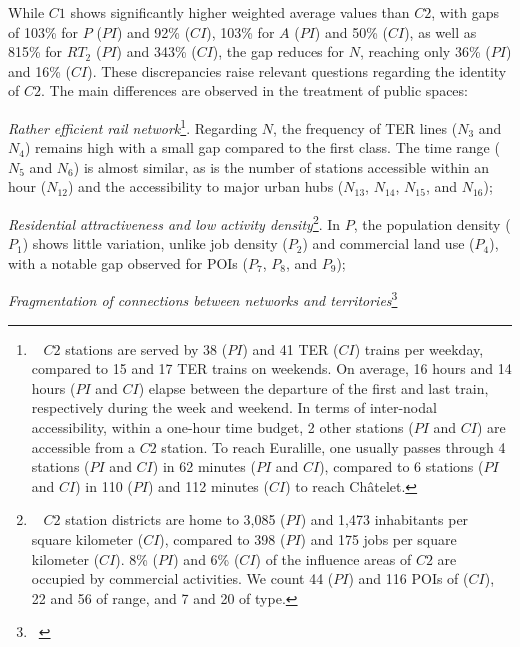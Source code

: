 \begin{refsegment}
While \(C1\) shows significantly higher weighted average values than \(C2\), with gaps of 103\% for \(P\) (\(PI\)) and 92\% (\(CI\)), 103\% for \(A\) (\(PI\)) and 50\% (\(CI\)), as well as 815\% for \(RT_{2}\) (\(PI\)) and 343\% (\(CI\)), the gap reduces for \(N\), reaching only 36\% (\(PI\)) and 16\% (\(CI\)). These discrepancies raise relevant questions regarding the identity of \(C2\). The main differences are observed in the treatment of public spaces:
\begin{customitemize}
    \item \textsl{Rather efficient rail network}\footnote{~
        \(C2\) stations are served by 38 (\(PI\)) and 41 \acrshort{TER} (\(CI\)) trains per weekday, compared to 15 and 17 \acrshort{TER} trains on weekends. On average, 16 hours and 14 hours (\(PI\) and \(CI\)) elapse between the departure of the first and last train, respectively during the week and weekend. In terms of inter-nodal accessibility, within a one-hour time budget, 2 other stations (\(PI\) and \(CI\)) are accessible from a \(C2\) station. To reach Euralille, one usually passes through 4 stations (\(PI\) and \(CI\)) in 62 minutes (\(PI\) and \(CI\)), compared to 6 stations (\(PI\) and \(CI\)) in 110 (\(PI\)) and 112 minutes (\(CI\)) to reach Châtelet.
    }. Regarding \(N\), the frequency of \acrshort{TER} lines (\(N_{3}\) and \(N_{4}\)) remains high with a small gap compared to the first class. The time range (\(N_{5}\) and \(N_{6}\)) is almost similar, as is the number of stations accessible within an hour (\(N_{12}\)) and the accessibility to major urban hubs (\(N_{13}\), \(N_{14}\), \(N_{15}\), and \(N_{16}\));
    \item \textsl{Residential attractiveness and low activity density}\footnote{~
        \(C2\) station districts are home to 3,085 (\(PI\)) and 1,473 inhabitants per square kilometer (\(CI\)), compared to 398 (\(PI\)) and 175 jobs per square kilometer (\(CI\)). 8\% (\(PI\)) and 6\% (\(CI\)) of the influence areas of \(C2\) are occupied by commercial activities. We count 44 (\(PI\)) and 116 \acrshort{POIs} of  (\(CI\)), 22 and 56 of  range, and 7 and 20 of  type.
    }. In \(P\), the population density (\(P_{1}\)) shows little variation, unlike job density (\(P_{2}\)) and commercial land use (\(P_{4}\)), with a notable gap observed for \acrshort{POIs} (\(P_{7}\), \(P_{8}\), and \(P_{9}\));
    \item \textsl{Fragmentation of connections between networks and territories}\footnote{~
}
\end{customitemize}
\end{refsegment}
